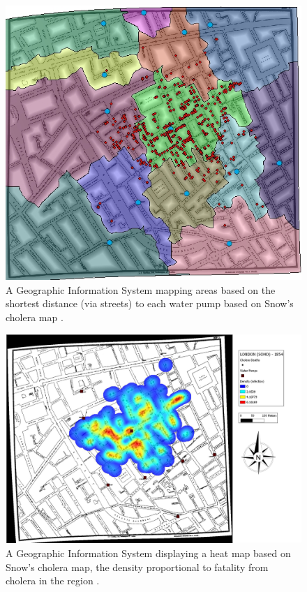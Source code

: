 \documentclass[12pt]{article}
\begin{document}
\begin{figure}
\centering
\includegraphics[scale=1.0]{gis_2}
\caption{
A Geographic Information System mapping areas based on the shortest distance (via streets) to each water pump based on Snow's cholera map \cite{udel2}.
}
\label{fig:gis2}
\end{figure}

\begin{figure}
\centering
\hspace*{-3cm}
\includegraphics[scale=0.3]{gis_heatmap}
\caption{ 
A Geographic Information System displaying a heat map based on Snow's cholera map, the density proportional to fatality from cholera in the region \cite{heatmap}.}
\label{fig:heatmap}
\end{figure}
\end{document}
